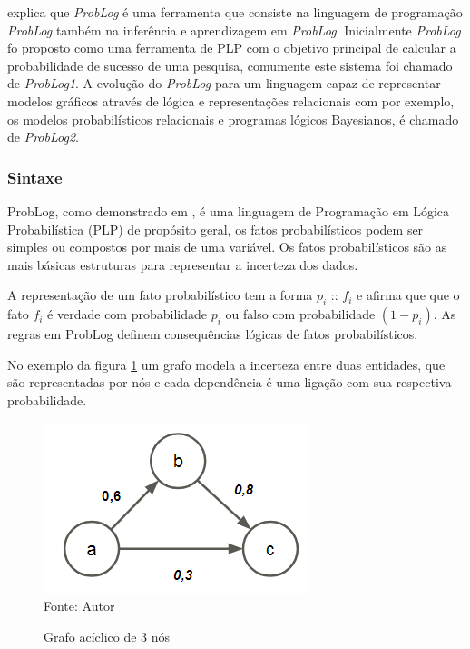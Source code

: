 \documentclass[
	12pt,				%
    oneside,			%
	a4paper,			%
	english,			%
	french,				%
	spanish,			%
	brazil,				%
	]{abntex2}
\begin{document}
 explica que \textit{ProbLog} é uma ferramenta que consiste na linguagem de programação \textit{ProbLog} também na inferência e aprendizagem em \textit{ProbLog}. Inicialmente \textit{ProbLog} fo proposto como uma ferramenta de PLP com o objetivo principal de calcular a probabilidade de sucesso de uma pesquisa, comumente este sistema foi chamado de \textit{ProbLog1}. A evolução do \textit{ProbLog} para um linguagem capaz de representar modelos gráficos através de lógica e representações relacionais com por exemplo, os modelos probabilísticos relacionais e programas lógicos Bayesianos, é chamado de \textit{ProbLog2}. 

\subsubsection{Sintaxe}
ProbLog, como demonstrado em , é uma linguagem de Programação em Lógica Probabilística (PLP) de propósito geral, os fatos probabilísticos podem ser simples ou compostos por mais de uma variável. Os fatos probabilísticos são as mais básicas estruturas para representar a incerteza dos dados.

A representação de um fato probabilístico tem a forma $p_{i}$ :: $f_{i}$ e afirma que que o fato $f_{i}$ é verdade com probabilidade $p_{i}$ ou falso com probabilidade $(1-p_{i})$. As regras em ProbLog definem consequências lógicas de fatos probabilísticos. 

No exemplo da figura \ref{fig:graph_acyclic} um grafo modela a incerteza entre duas entidades, que são representadas por nós e cada dependência é uma ligação com sua respectiva probabilidade.


\begin{figure}[H]
    \centering
    \caption{Grafo acíclico de 3 nós}
    \includegraphics[scale=1.3]{graph_acyclic1}\\
    Fonte: Autor\hfill
    \label{fig:graph_acyclic}
\end{figure} 
\end{document}
